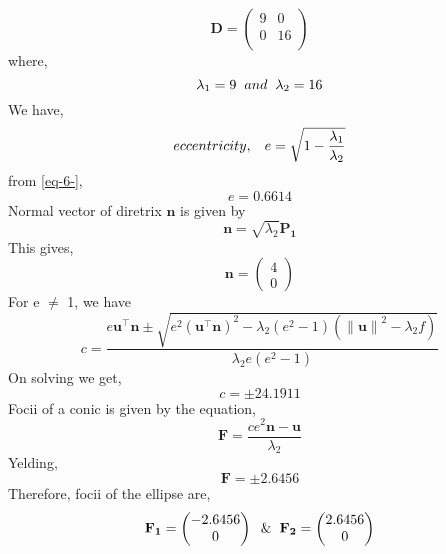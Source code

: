 \documentclass[journal,10pt,twocolumn]{article}
\providecommand{\norm}[1]{\left\lVert#1\right\rVert}
\let\vec\mathbf
\newcommand{\myvec}[1]{\ensuremath{\begin{pmatrix}#1\end{pmatrix}}}
\providecommand{\brak}[1]{\ensuremath{\left(#1\right)}}
\begin{document}
{\begin{equation}
\vec{D} = \begin{pmatrix} 
	9 & 0 \\
	0 & 16 \\
	\end{pmatrix}
\label{eq-5-}
\end{equation}
where,
\begin{equation}
\lambda_1 = 9 \hspace{2mm} and \hspace{2mm} \lambda_2 = 16
\label{eq-6-}
\end{equation}
We have,
\begin{equation}
eccentricity, \hspace{3mm} e = \sqrt{1-\frac{\lambda_1}{\lambda_2}}
\label{eq-7-}
\end{equation}
from \eqref{eq-6-},
\begin{equation}
e = 0.6614
\label{eq-8-}
\end{equation}
Normal vector of diretrix $\vec{n}$ is given by
\begin{equation}
\vec{n} = \sqrt{\lambda_2}\vec{P_1}
\label{eq-9-}
\end{equation}
This gives,
\begin{equation}
\vec{n} = \myvec{4 \\ 0}
\label{eq-10-}
\end{equation}
For e $\neq$ 1, we have
\begin{equation}
c = \frac{e\vec{u}^{\top} \vec{n}\pm \sqrt{e^2\brak{\vec{u}^{\top}\vec{n}}^2 - \lambda_2 \brak{e^2-1}\brak{\norm{\vec{u}}^2-\lambda_2 f }}}{\lambda_2 e \brak{e^2-1}}
\label{eq-11-}
\end{equation}
On solving we get,
\begin{equation}
c = \pm 24.1911
\label{eq-12-}
\end{equation}
Focii of a conic is given by the equation,
\begin{equation}
\vec{F} = \frac{ce^2\vec{n}-\vec{u}}{\lambda_2}
\label{eq-13-}
\end{equation}
Yelding,
\begin{equation}
\vec{F} = \pm 2.6456
\label{eq-14-}
\end{equation}
Therefore, focii of the ellipse are,
\begin{equation}
\vec{F_1} = \myvec{-2.6456 \\ 0} \hspace{2mm} \& \hspace{2mm} \vec{F_2} = \myvec{2.6456 \\ 0}
\label{eq-15-}
\end{equation}
}
\end{document}
